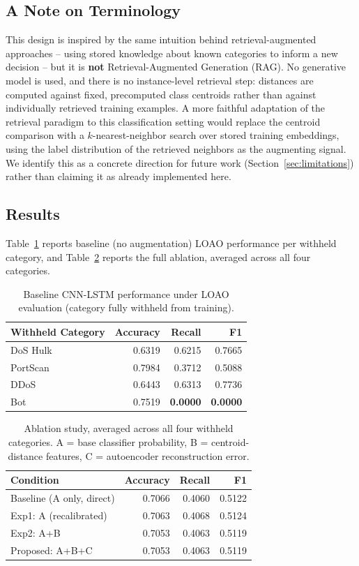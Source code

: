 \documentclass[11pt]{article}
\begin{document}
\subsection{A Note on Terminology}

This design is inspired by the same intuition behind retrieval-augmented approaches -- using stored
knowledge about known categories to inform a new decision -- but it is \textbf{not}
Retrieval-Augmented Generation (RAG). No generative model is used, and there is no instance-level
retrieval step: distances are computed against fixed, precomputed class centroids rather than
against individually retrieved training examples. A more faithful adaptation of the retrieval
paradigm to this classification setting would replace the centroid comparison with a
$k$-nearest-neighbor search over stored training embeddings, using the label distribution of the
retrieved neighbors as the augmenting signal. We identify this as a concrete direction for future
work (Section~\ref{sec:limitations}) rather than claiming it as already implemented here.

\subsection{Results}
\label{sec:loao-results}

Table~\ref{tab:loao} reports baseline (no augmentation) LOAO performance per withheld category, and
Table~\ref{tab:ablation} reports the full ablation, averaged across all four categories.

\begin{table}[h]
\centering
\caption{Baseline CNN-LSTM performance under LOAO evaluation (category fully withheld from training).}
\label{tab:loao}
\begin{tabular}{lrrr}
\toprule
Withheld Category & Accuracy & Recall & F1 \\
\midrule
DoS Hulk & 0.6319 & 0.6215 & 0.7665 \\
PortScan & 0.7984 & 0.3712 & 0.5088 \\
DDoS & 0.6443 & 0.6313 & 0.7736 \\
Bot & 0.7519 & \textbf{0.0000} & \textbf{0.0000} \\
\bottomrule
\end{tabular}
\end{table}

\begin{table}[h]
\centering
\caption{Ablation study, averaged across all four withheld categories. A = base classifier
probability, B = centroid-distance features, C = autoencoder reconstruction error.}
\label{tab:ablation}
\begin{tabular}{lrrr}
\toprule
Condition & Accuracy & Recall & F1 \\
\midrule
Baseline (A only, direct) & 0.7066 & 0.4060 & 0.5122 \\
Exp1: A (recalibrated) & 0.7063 & 0.4068 & 0.5124 \\
Exp2: A+B & 0.7053 & 0.4063 & 0.5119 \\
Proposed: A+B+C & 0.7053 & 0.4063 & 0.5119 \\
\bottomrule
\end{tabular}
\end{table}
\end{document}
